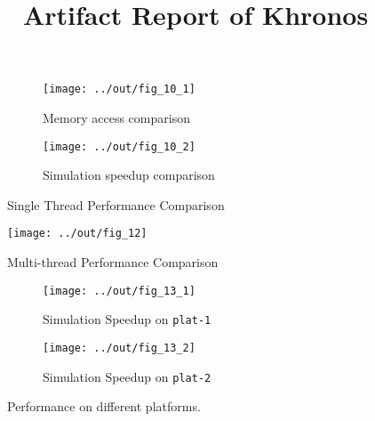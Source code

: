 \documentclass{sig-alternate}
\title{Artifact Report of Khronos}
\begin{document}
\maketitle

\pagestyle{plain}

\begin{figure*}[t]
  \centering
  \begin{subfigure}{\linewidth}
    \centering
    \caption{Memory access comparison}
    \texttt{[image: ../out/fig\_10\_1]}
  \end{subfigure}
  \begin{subfigure}{\linewidth}
    \centering
    \caption{Simulation speedup comparison}
    \texttt{[image: ../out/fig\_10\_2]}
  \end{subfigure}
  \vspace*{-5mm}
  \caption{Single Thread Performance Comparison}
\end{figure*}

\begin{figure*}
  \centering
  \texttt{[image: ../out/fig\_12]}
  \vspace*{-5mm}
  \caption{Multi-thread Performance Comparison}
\end{figure*}

\begin{figure*}[t]
  \begin{subfigure}{\linewidth}
    \caption{Simulation Speedup on \texttt{plat-1}}
    \texttt{[image: ../out/fig\_13\_1]}
  \end{subfigure}
  \begin{subfigure}{\linewidth}
    \caption{Simulation Speedup on \texttt{plat-2}}
    \texttt{[image: ../out/fig\_13\_2]}
  \end{subfigure}
  \vspace*{-4mm}
  \caption{Performance on different platforms. }
\end{figure*}






\end{document}
